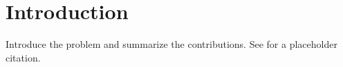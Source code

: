 \section{Introduction}

Introduce the problem and summarize the contributions. See \cite{sample-reference} for a placeholder citation.
